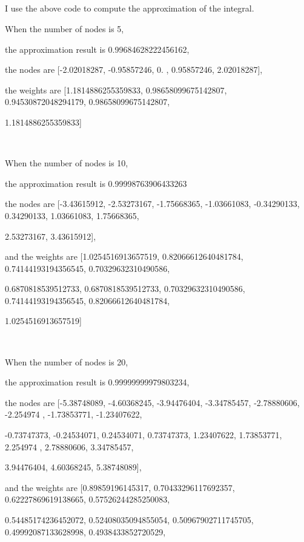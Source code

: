 \documentclass{article}
\begin{document}
	\subsection{}
		I use the above code to compute the approximation of the integral.\par
		When the number of nodes is 5, \par the approximation result is 0.99684628222456162, \par the nodes are [-2.02018287, -0.95857246,  0.        ,  0.95857246,  2.02018287], \par the weights are [1.1814886255359833,
 0.98658099675142807,
 0.94530872048294179,
 0.98658099675142807,\par
 1.1814886255359833]
 		\par
		\ 
		\par
		When the number of nodes is 10, \par
		the approximation result is 0.99998763906433263 \par
		the nodes are [-3.43615912, -2.53273167, -1.75668365, -1.03661083, -0.34290133,
         0.34290133,  1.03661083,  1.75668365, \par 2.53273167,  3.43615912], \par
         	and the weights are [1.0254516913657519,
 0.82066612640481784,
 0.74144193194356545,
 0.70329632310490586,\par
 0.6870818539512733,
 0.6870818539512733,
 0.70329632310490586,
 0.74144193194356545,
 0.82066612640481784,\par
 1.0254516913657519] \par
 		\ 
		\par
 		When the number of nodes is 20, \par
		the approximation result is 0.99999999979803234, \par
		the nodes are [-5.38748089, -4.60368245, -3.94476404, -3.34785457, -2.78880606,
        -2.254974  , -1.73853771, -1.23407622, \par -0.73747373, -0.24534071,
         0.24534071,  0.73747373,  1.23407622,  1.73853771,  2.254974  ,
         2.78880606,  3.34785457,  \par 3.94476404,  4.60368245,  5.38748089], \par
         	and the weights are [0.89859196145317,
 0.70433296117692357,
 0.62227869619138665,
 0.57526244285250083,\par
 0.54485174236452072,
 0.52408035094855054,
 0.50967902711745705,
 0.49992087133628998,
 0.4938433852720529,\par
\end{document}
